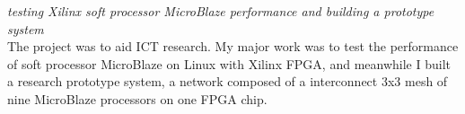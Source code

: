 \documentclass[11pt,a4paper]{moderncv}
\begin{document}
{
    \smallskip
    \emph{testing Xilinx soft processor MicroBlaze performance and building a prototype system}
    \medskip  \\
    The project was to aid ICT research. My major work was to test the performance of soft processor MicroBlaze on Linux with Xilinx FPGA, and meanwhile I built a research prototype system, a network composed of a interconnect 3x3 mesh of nine MicroBlaze processors on one FPGA chip.\newline
}



\nocite{*}





\begin{comment}
	\begin{flushleft}
	\vspace{2cm}\hspace{3.5cm}
	Musterstadt, den \today
	\end{flushleft}


	\vspace{1cm} \hspace{3.5cm}
	Max Mustermann
\end{comment}
\end{document}
